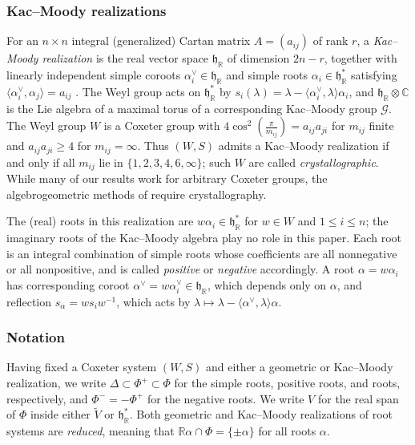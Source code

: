 \documentclass[11pt]{amsart}
\theoremstyle{definition}
\theoremstyle{remark}
\numberwithin{equation}{section}
\newcommand{\R}{\mathbb R}
\newcommand{\C}{\mathbb C}
\begin{document}
\subsubsection{Kac--Moody realizations}
For an $n\times n$ integral (generalized) Cartan matrix $A=(a_{ij})$ of rank $r$, a \emph{Kac--Moody realization} is the real vector space $\mathfrak h_\R$ of dimension $2n-r$, together with linearly independent simple coroots $\alpha_i^\vee\in\mathfrak h_\R$ and simple roots $\alpha_i\in\mathfrak h_\R^*$ satisfying $\langle\alpha_i^\vee,\alpha_j\rangle=a_{ij}$ \cite[\S1.1]{Kumar}. The Weyl group acts on $\mathfrak h_\R^*$ by $s_i(\lambda)=\lambda-\langle\alpha_i^\vee,\lambda\rangle\alpha_i$, and $\mathfrak h_\R\otimes\C$ is the Lie algebra of a maximal torus of a corresponding Kac--Moody group $\mathcal{G}$. The Weyl group $W$ is a Coxeter group with $4\cos^2\left(\frac{\pi}{m_{ij}}\right)=a_{ij}a_{ji}$ for $m_{ij}$ finite and $a_{ij}a_{ji} \geq 4$ for $m_{ij}=\infty$. Thus $(W,S)$ admits a Kac--Moody realization if and only if all $m_{ij}$ lie in $\{1,2,3,4,6,\infty\}$; such $W$ are called \emph{crystallographic}. While many of our results work for arbitrary Coxeter groups, the algebrogeometric methods of  require crystallography.

The (real) roots in this realization are $w\alpha_i\in\mathfrak h_\R^*$ for $w\in W$ and $1\le i\le n$; the imaginary roots of the Kac--Moody algebra play no role in this paper. Each root is an integral combination of simple roots whose coefficients are all nonnegative or all nonpositive, and is called \emph{positive} or \emph{negative} accordingly. A root $\alpha=w\alpha_i$ has corresponding coroot $\alpha^\vee=w\alpha_i^\vee\in\mathfrak h_\R$, which depends only on $\alpha$, and reflection $s_\alpha=ws_iw^{-1}$, which acts by $\lambda\mapsto\lambda-\langle\alpha^\vee,\lambda\rangle\alpha$.

\subsubsection{Notation} Having fixed a Coxeter system $(W,S)$ and either a geometric or Kac--Moody realization, we write $\Delta \subset \Phi^+ \subset \Phi$ for the simple roots, positive roots, and roots, respectively, and $\Phi^-=-\Phi^+$ for the negative roots. We write $V$ for the real span of $\Phi$ inside either $\tilde V$ or $\mathfrak{h}^*_\R$. Both geometric and Kac--Moody realizations of root systems are \emph{reduced}, meaning that $\R\alpha \cap \Phi = \{\pm \alpha\}$ for all roots $\alpha$.
\end{document}
